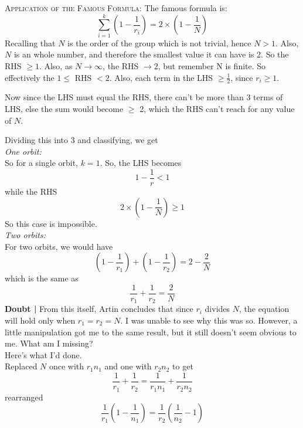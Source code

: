 \documentclass[12pt]{article}
\begin{document}
\textsc {Application of the Famous Formula: } The famous formula is:
\begin{equation}
\sum\limits_{i=1}^{k} (1 - \frac{1}{r_{i}}) = 2 \times (1 - \frac{1}{N})
\label{eqn.E}
\end{equation}
Recalling that $N$ is the order of the group which is not trivial, hence $N>1$. Also, $N$ is an whole number, and therefore the smallest value it can have is 2. So the RHS $\geq 1$. Also, as $N \to\infty$, the RHS $\to 2$, but remember N is finite. So effectively the $1\leq$ RHS $< 2$. Also, each term in the LHS $\geq \frac{1}{2}$, since $r_{i} \geq 1$.
\par
Now since the LHS must equal the RHS, there can't be more than 3 terms of LHS, else the sum would become $\geq$ 2, which the RHS can't reach for any value of $N$.
\par
Dividing this into 3 and classifying, we get\\
\emph{One orbit: }\\
So for a single orbit, $k=1$. So, the LHS becomes
\begin{equation}
1-\frac{1}{r} < 1
\end{equation}
while the RHS
\begin{equation}
2 \times (1 - \frac{1}{N}) \geq 1
\end{equation}
So this case is impossible.\\
\emph{Two orbits: }\\
For two orbits, we would have
\begin{equation}
(1 - \frac{1}{r_{1}}) + (1 - \frac{1}{r_{2}}) = 2 - \frac{2}{N}
\end{equation}
which is  the same as
\begin{equation}
\frac{1}{r_{1}} + \frac{1}{r_{2}} = \frac{2}{N}
\end{equation}
{\bf Doubt | } From this itself, Artin concludes that since $r_{i}$ divides $N$, the equation will hold only when $r_{1}=r_{2}=N$. I was unable to see why this was so. However, a little manipulation got me to the same result, but it still doesn't seem obvious to me. What am I missing?\\
Here's what I'd done.\\
Replaced $N$ once with $r_{1}n_{1}$ and one with $r_{2}n_{2}$ to get
\begin{equation}
\frac{1}{r_{1}} + \frac{1}{r_{2}} = \frac{1}{r_{1}n_{1}} + \frac{1}{r_{2}n_{2}}
\end{equation}
rearranged
\begin{equation}
\frac{1}{r_{1}}(1 - \frac{1}{n_{1}}) = \frac{1}{r_{2}}(\frac{1}{n_{2}} - 1)
\end{equation}
\end{document}
